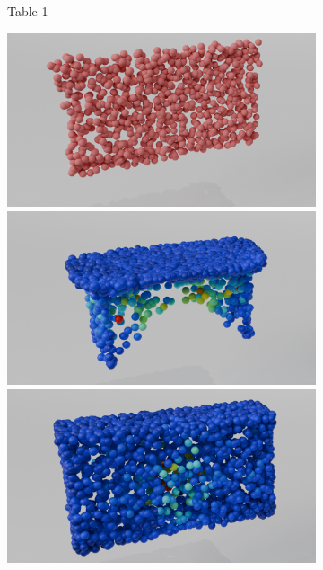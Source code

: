 \begin{figure}[htb]
\begin{subfigure}[t]{\textwidth+20pt\relax}
        \caption{Table 1}
    \end{subfigure}\hfill
    \begin{subfigure}[t]{0.315\textwidth}
        \includegraphics[width=\textwidth]{figures/part_t2.png}
        \includegraphics[width=\textwidth]{figures/dc_lin_t2.png}
        \includegraphics[width=\textwidth]{figures/do_lin_t2.png}

\end{subfigure}
\end{figure}
